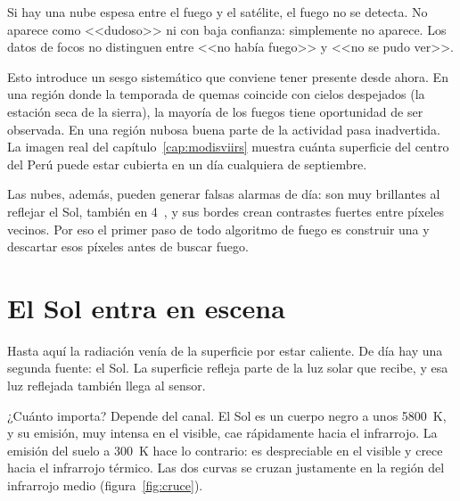 \begin{atencion}
Si hay una nube espesa entre el fuego y el satélite, el fuego no se detecta. No aparece como
<<dudoso>> ni con baja confianza: simplemente no aparece. Los datos de focos no distinguen entre
<<no había fuego>> y <<no se pudo ver>>.
\end{atencion}

Esto introduce un sesgo sistemático que conviene tener presente desde ahora. En una región
donde la temporada de quemas coincide con cielos despejados (la estación seca de la sierra), la
mayoría de los fuegos tiene oportunidad de ser observada. En una región nubosa buena parte de la
actividad pasa inadvertida. La imagen real del capítulo~\ref{cap:modisviirs} muestra cuánta
superficie del centro del Perú puede estar cubierta en un día cualquiera de septiembre.

Las nubes, además, pueden generar falsas alarmas de día: son muy brillantes al reflejar el Sol,
también en 4~\um, y sus bordes crean contrastes fuertes entre píxeles vecinos. Por eso el primer
paso de todo algoritmo de fuego es construir una  y descartar esos
píxeles antes de buscar fuego.

\section{El Sol entra en escena}

Hasta aquí la radiación venía de la superficie por estar caliente. De día hay una segunda
fuente: el Sol. La superficie refleja parte de la luz solar que recibe, y esa luz reflejada
también llega al sensor.

¿Cuánto importa? Depende del canal. El Sol es un cuerpo negro a unos 5800~K, y su emisión, muy
intensa en el visible, cae rápidamente hacia el infrarrojo. La emisión del suelo a 300~K hace lo
contrario: es despreciable en el visible y crece hacia el infrarrojo térmico. Las dos curvas se
cruzan justamente en la región del infrarrojo medio (figura~\ref{fig:cruce}).

